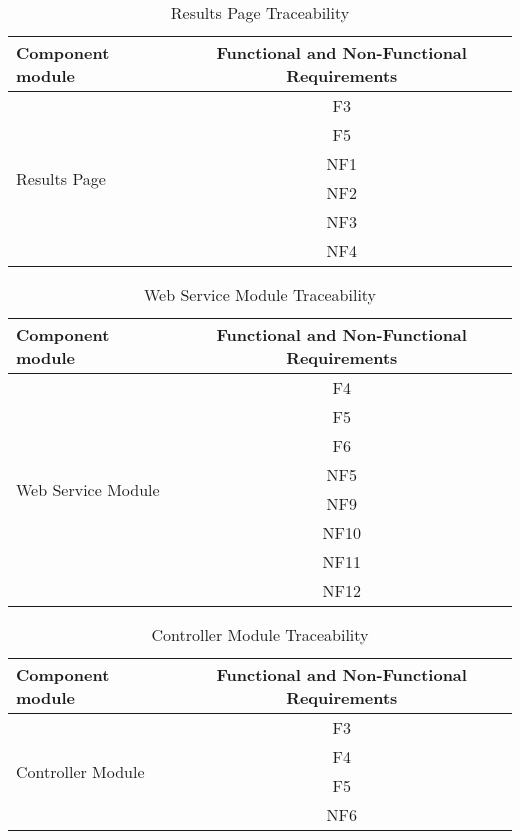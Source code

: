 \documentclass{article}
\begin{document}
\begin{table}[H]
    \caption{Results Page Traceability}
    \centering
    \begin{tabular}{|l|c|} \hline
        \textbf{Component module} & \textbf{Functional and Non-Functional Requirements} \\ \hline
         \multirow{6}{*}{Results Page} & F3 \\ \cline{2-2}
         & F5 \\ \cline{2-2}
         & NF1 \\ \cline{2-2}
         & NF2 \\ \cline{2-2}
         & NF3 \\ \cline{2-2}
         & NF4 \\ \hline
    \end{tabular}
    \label{tab:Results_Traceability}
\end{table}

\begin{table}[H]
    \caption{Web Service Module Traceability}
    \centering
    \begin{tabular}{|l|c|} \hline
        \textbf{Component module} & \textbf{Functional and Non-Functional Requirements} \\ \hline
         \multirow{8}{*}{Web Service Module} & F4 \\ \cline{2-2}
         & F5 \\ \cline{2-2}
         & F6 \\ \cline{2-2}
         & NF5 \\ \cline{2-2}
         & NF9 \\ \cline{2-2}
         & NF10 \\ \cline{2-2}
         & NF11 \\ \cline{2-2}
         & NF12 \\ \hline
    \end{tabular}
    \label{tab:Web_Service_Traceability}
\end{table}

\begin{table}[H]
    \caption{Controller Module Traceability}
    \centering
    \begin{tabular}{|l|c|} \hline
        \textbf{Component module} & \textbf{Functional and Non-Functional Requirements} \\ \hline
         \multirow{4}{*}{Controller Module} & F3 \\ \cline{2-2}
         & F4 \\ \cline{2-2}
         & F5 \\ \cline{2-2}
         & NF6 \\ \hline
    \end{tabular}
    \label{tab:Controller_Traceability}
\end{table}
\end{document}
